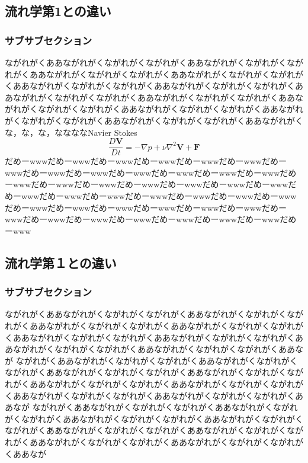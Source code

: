 \documentclass[uplatex,12pt]{jsbook}
\begin{document}
	\subsection{流れ学第1との違い}
	\subsubsection{サブサブセクション}
	ながれがくああながれがくながれがくながれがくああながれがくながれがくながれがくああながれがくながれがくながれがくああながれがくながれがくながれがくああながれがくながれがくながれがくああながれがくながれがくながれがくああながれがくながれがくながれがくああながれがくながれがくながれがくああながれがくながれがくながれがくああながれがくながれがくながれがくああながれがくながれがくながれがくああながれがくながれがくながれがくああながれがくな，な，な，ななななNavier Stokes
	\[
		\frac{D\bm{V}}{Dt} = -\nabla p + \nu\nabla^2\bm{V} + \bm{F}
	\]だめーwwwだめーwwwだめーwwwだめーwwwだめーwwwだめーwwwだめーwwwだめーwwwだめーwwwだめーwwwだめーwwwだめーwwwだめーwwwだめーwwwだめーwwwだめーwwwだめーwwwだめーwwwだめーwwwだめーwwwだめーwwwだめーwwwだめーwwwだめーwwwだめーwwwだめーwwwだめーwwwだめーwwwだめーwwwだめーwwwだめーwwwだめーwwwだめーwwwだめーwwwだめーwwwだめーwwwだめーwwwだめーwwwだめーwwwだめーwwwだめーwww
	\subsection{流れ学第１との違い}
	\subsubsection{サブサブセクション}
	ながれがくああながれがくながれがくながれがくああながれがくながれがくながれがくああながれがくながれがくながれがくああながれがくながれがくながれがくああながれがくながれがくながれがくああながれがくながれがくながれがくああながれがくながれがくながれがくああながれがくながれがくながれがくああなが
	ながれがくああながれがくながれがくながれがくああながれがくながれがくながれがくああながれがくながれがくながれがくああながれがくながれがくながれがくああながれがくながれがくながれがくああながれがくながれがくながれがくああながれがくながれがくながれがくああながれがくながれがくながれがくああなが
	ながれがくああながれがくながれがくながれがくああながれがくながれがくながれがくああながれがくながれがくながれがくああながれがくながれがくながれがくああながれがくながれがくながれがくああながれがくながれがくながれがくああながれがくながれがくながれがくああながれがくながれがくながれがくああなが
	
\end{document}

